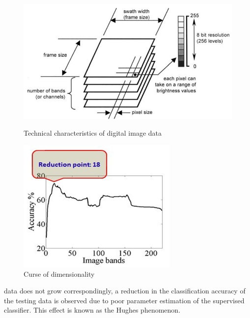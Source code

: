 \documentclass[document.tex]{subfiles}
\begin{document}
\begin{figure}[H]
	\centering
	\begin{minipage}{0.450\textwidth}
		\centering
		\includegraphics[height=0.7\textwidth]{imgs/capture.png} %
		\caption{Technical characteristics of
			digital image data\cite{3}}
		\label{fig: Technical characteristics of
			digital image data}
	\end{minipage}
	\begin{minipage}{0.45\textwidth}
		\centering
		\includegraphics[width=0.7\textwidth]{imgs/curse.png} %
		\caption{Curse of dimensionality\cite{9}}
		\label{fig: Curse of dimensionality}
	\end{minipage}\hfill
\end{figure}
 \noindent data does not grow correspondingly, a reduction in the classification accuracy of the testing data is observed due to poor parameter estimation of the supervised classifier. This effect is known as the Hughes phenomenon\cite{1}.
\end{document}
